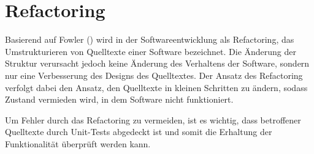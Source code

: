 \section{Refactoring}

Basierend auf Fowler (\citeyear[S. 79-80]{Fowler2020}) wird in der Softwareentwicklung als Refactoring, das Umstrukturieren von Quelltexte einer Software bezeichnet. Die Änderung der Struktur verursacht jedoch keine Änderung des Verhaltens der Software, sondern nur eine Verbesserung des Designs des Quelltextes.
Der Ansatz des Refactoring verfolgt dabei den Ansatz, den Quelltexte in kleinen Schritten zu ändern, sodass Zustand vermieden wird, in dem Software nicht funktioniert.  

Um Fehler durch das Refactoring zu vermeiden, ist es wichtig, dass betroffener Quelltexte durch Unit-Tests abgedeckt ist und somit die Erhaltung der Funktionalität überprüft werden kann. 
